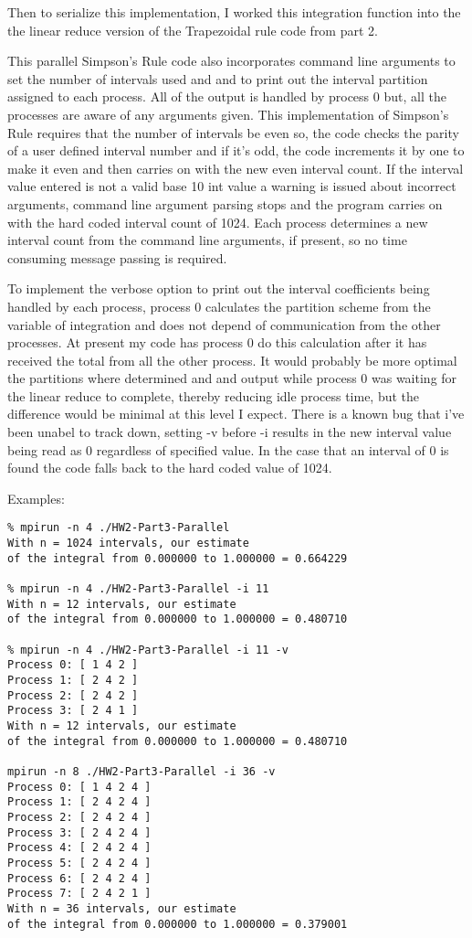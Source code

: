 \documentclass{IEEEtran}
\begin{document}
Then to serialize this implementation, I worked this integration function into the the linear reduce version of the Trapezoidal rule code from part 2. 

This parallel Simpson’s Rule code also incorporates command line arguments to set the number of intervals used and and to print out the interval partition assigned to each process. All of the output is handled by process 0 but, all the processes are aware of any arguments given.  This implementation of Simpson's Rule requires that the number of intervals be even so, the code checks the parity of a user defined interval number and if it’s odd, the code increments it by one to make it even and then carries on with the new even interval count. If the interval value entered is not a valid base 10 int value a warning is issued about incorrect arguments, command line argument parsing stops and the program carries on with the hard coded interval count of 1024. Each process determines a new interval count from the command line arguments, if present, so no time consuming message passing is required. 

To implement the verbose option to print out the interval coefficients being handled by each process, process 0 calculates the partition scheme from the variable of integration and does not depend of communication from the other processes. At present my code has process 0  do this calculation after it has received the total from all the other process. It would probably be more optimal the partitions where determined and and output while process 0 was waiting for the linear reduce to complete, thereby reducing idle process time, but the difference would be minimal at this level I expect. There is a known bug that i've been unabel to track down, setting -v before -i results in the new interval value being read as 0 regardless of specified value. In the case that an interval of 0 is found the code falls back to the hard coded value of 1024.

Examples:

\begin{verbatim}
% mpirun -n 4 ./HW2-Part3-Parallel         
With n = 1024 intervals, our estimate
of the integral from 0.000000 to 1.000000 = 0.664229

% mpirun -n 4 ./HW2-Part3-Parallel -i 11
With n = 12 intervals, our estimate
of the integral from 0.000000 to 1.000000 = 0.480710

% mpirun -n 4 ./HW2-Part3-Parallel -i 11 -v
Process 0: [ 1 4 2 ]
Process 1: [ 2 4 2 ]
Process 2: [ 2 4 2 ]
Process 3: [ 2 4 1 ]
With n = 12 intervals, our estimate
of the integral from 0.000000 to 1.000000 = 0.480710

mpirun -n 8 ./HW2-Part3-Parallel -i 36 -v
Process 0: [ 1 4 2 4 ]
Process 1: [ 2 4 2 4 ]
Process 2: [ 2 4 2 4 ]
Process 3: [ 2 4 2 4 ]
Process 4: [ 2 4 2 4 ]
Process 5: [ 2 4 2 4 ]
Process 6: [ 2 4 2 4 ]
Process 7: [ 2 4 2 1 ]
With n = 36 intervals, our estimate
of the integral from 0.000000 to 1.000000 = 0.379001

\end{verbatim}
\end{document}
